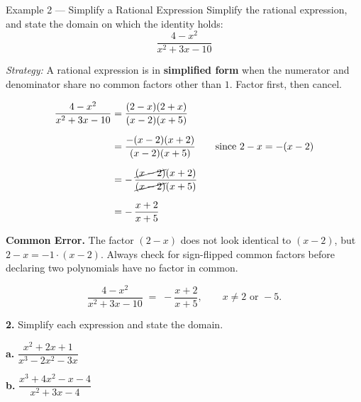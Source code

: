 \documentclass[11pt]{article}
\newcommand{\workspace}[1]{\vspace{#1}}
\begin{document}
\begin{example}{Example 2 --- Simplify a Rational Expression}
Simplify the rational expression, and state the domain on which the identity holds:
\[
\dfrac{4-x^{2}}{x^{2}+3x-10}
\]

\vspace{0.5em}
\textit{Strategy:} A rational expression is in \textbf{simplified form} when the numerator and denominator share no common factors other than $1$. Factor first, then cancel.

\begin{align*}
\dfrac{4-x^{2}}{x^{2}+3x-10} &= \dfrac{(2-x)(2+x)}{(x-2)(x+5)} \\[6pt]
&= \dfrac{-(x-2)(x+2)}{(x-2)(x+5)} \qquad \text{since } 2-x = -(x-2)\\[6pt]
&= -\,\dfrac{\cancel{(x-2)}(x+2)}{\cancel{(x-2)}(x+5)} \\[6pt]
&= -\,\dfrac{x+2}{x+5}
\end{align*}

\begin{annot}
\textbf{Common Error.} The factor $(2-x)$ does not look identical to $(x-2)$, but $2-x = -1\cdot(x-2)$. Always check for sign-flipped common factors before declaring two polynomials have no factor in common.
\end{annot}

\[
\dfrac{4-x^{2}}{x^{2}+3x-10} \;=\; -\dfrac{x+2}{x+5}, \qquad x \neq 2 \text{ or } -5.
\]
\end{example}

\begin{tryit}
\textbf{2.} Simplify each expression and state the domain.

\vspace{0.3em}
\begin{minipage}[t]{0.48\textwidth}
\textbf{a.} $\dfrac{x^{2}+2x+1}{x^{3}-2x^{2}-3x}$
\workspace{3.5cm}
\end{minipage}\hfill
\begin{minipage}[t]{0.48\textwidth}
\textbf{b.} $\dfrac{x^{3}+4x^{2}-x-4}{x^{2}+3x-4}$
\workspace{3.5cm}
\end{minipage}
\end{tryit}

\newpage
\end{document}
